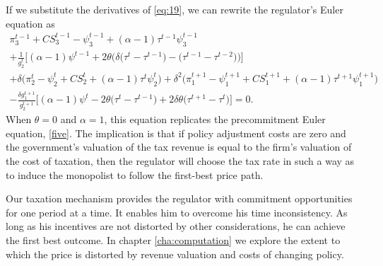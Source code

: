 If we substitute the derivatives of \eqref{eq:19}, we can rewrite the
regulator's Euler equation as%
\begin{multline}
\pi _{3}^{t-1}+CS_{3}^{t-1}-\psi _{3}^{t-1}+(\alpha -1)\tau ^{t-1}\psi
_{3}^{t-1}  \label{eq:20} \\
+\frac{1}{g_{2}^{t}}\bigg[(\alpha -1)\psi ^{t-1}+2\theta \Big(\delta \big( %
\tau ^{t}-\tau ^{t-1}\big)-\big(\tau ^{t-1}-\tau ^{t-2}\big)\Big)\bigg] \\
+\delta \big(\pi _{2}^{t}-\psi _{2}^{t}+CS_{2}^{t}+(\alpha -1)\tau ^{t}\psi
_{2}^{t}\big)+\delta ^{2}\big(\pi _{1}^{t+1}-\psi
_{1}^{t+1}+CS_{1}^{t+1}+(\alpha -1)\tau ^{t+1}\psi _{1}^{t+1}\big) \\
-\frac{\delta g_{1}^{t+1}}{g_{2}^{t+1}}\Big[(\alpha -1)\psi ^{t}-2\theta %
\big(\tau ^{t}-\tau ^{t-1}\big)+2\delta \theta \big(\tau ^{t+1}-\tau ^{t} %
\big)\Big]=0.
\end{multline}
When $\theta =0$ and $\alpha =1$, this equation replicates the precommitment
Euler equation, \eqref{five}. The implication is that if policy adjustment
costs are zero and the government's valuation of the tax revenue is equal to
the firm's valuation of the cost of taxation, then the regulator will choose
the tax rate in such a way as to induce the monopolist to follow the
first-best price path.

Our taxation mechanism provides the regulator with commitment opportunities
for one period at a time. It enables him to overcome his time inconsistency.
As long as his incentives are not distorted by other considerations, he can
achieve the first best outcome. In chapter \ref{cha:computation} we explore
the extent to which the price is distorted by revenue valuation and costs of
changing policy.


